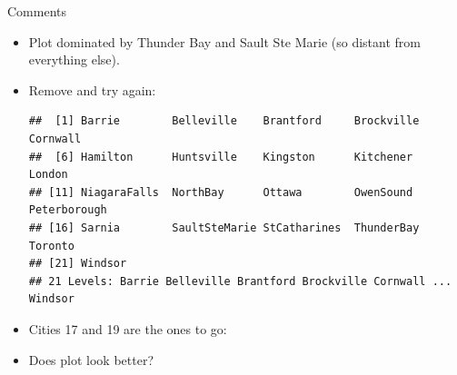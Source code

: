\begin{frame}[fragile]{Comments}
  
  \begin{itemize}
  \item Plot dominated by Thunder Bay and Sault Ste Marie (so distant
    from everything else).
  \item Remove and try again:

\begin{knitrout}\footnotesize
{}\color{fgcolor}\begin{kframe}
\begin{alltt}
\hlopt{$}
\end{alltt}
\begin{verbatim}
##  [1] Barrie        Belleville    Brantford     Brockville    Cornwall     
##  [6] Hamilton      Huntsville    Kingston      Kitchener     London       
## [11] NiagaraFalls  NorthBay      Ottawa        OwenSound     Peterborough 
## [16] Sarnia        SaultSteMarie StCatharines  ThunderBay    Toronto      
## [21] Windsor      
## 21 Levels: Barrie Belleville Brantford Brockville Cornwall ... Windsor
\end{verbatim}
\end{kframe}
\end{knitrout}

\item Cities 17 and 19 are the ones to go:
  
\begin{knitrout}\small
{}\color{fgcolor}\begin{kframe}
\begin{alltt}
\hlkwb{=}\hlstd{ontario[}\hlstd{(}\hlopt{-}\hlstd{,}\hlopt{-}\hlstd{),}\hlstd{(}\hlopt{-}\hlstd{,}\hlopt{-}\hlstd{)]}
\hlkwb{=}
\hlkwb{=}
\hlkwb{=}\hlstd{=}
\hlkwb{=}\hlstd{(}\hlopt{+}\hlstd{()}\hlopt{+}
  \hlstd{()}\hlopt{+}\hlstd{()}
\end{alltt}
\end{kframe}
\end{knitrout}
      

\item Does plot look better?
  \end{itemize}
  
\end{frame}

